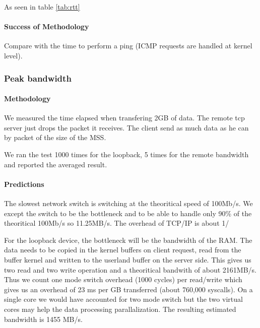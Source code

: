 As seen in table \ref{tab:rtt}
\paragraph{Success of Methodology}

 Compare with the time to perform a ping (ICMP requests are handled at kernel level).






\subsubsection{Peak bandwidth}
\paragraph{Methodology}
We measured the time elapsed when transfering 2GB of data.
The remote tcp server just drops the packet it receives.
The client send as much data as he can by packet of the size of the MSS.

We ran the test 1000 times for the loopback, 5 times for the remote bandwidth
and reported the averaged result.

\paragraph{Predictions}
The slowest network switch is switching at the theoritical speed of 100Mb/s.
We except the switch to be the bottleneck and to be able to handle only 90\% of
the theoritical 100Mb/s so 11.25MB/s.
The overhead of TCP/IP is about 1/

For the loopback device, the bottleneck will be the bandwidth of the RAM.
The data needs to be copied in the kernel buffers on client request, read from
the buffer kernel and written to the userland buffer on the server side.
This gives us two read and two write operation and a theoritical bandwith of
about 2161MB/s.
Thus we count one mode switch overhead (1000 cycles) per read/write which gives
us an overhead of 23 ms per GB transferred (about 760,000 syscalls).
On a single core we would have accounted for two mode switch but the two virtual
cores may help the data processing parallalization.
The resulting estimated bandwidth is 1455 MB/s.

